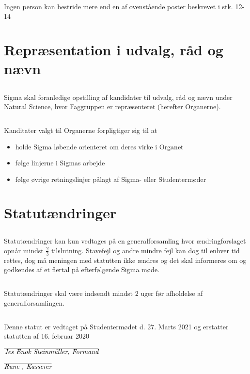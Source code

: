 \documentclass[danish,a4paper,twocolumn]{article}
\begin{document}
\subsection{}Ingen person kan bestride mere end en af ovenstående poster beskrevet i stk. 12-14

\section{Repræsentation i udvalg, råd og nævn}
\subsection{}Sigma skal foranledige opstilling af kandidater til udvalg, råd og
nævn under Natural Science, hvor Faggruppen er repræsenteret (herefter Organerne).

\subsection{}Kanditater valgt til Organerne forpligtiger sig til at
\begin{itemize}
        \item holde Sigma løbende orienteret om deres virke i Organet
        \item følge linjerne i Sigmas arbejde
        \item følge øvrige retningslinjer pålagt af Sigma- eller Studentermøder
\end{itemize}

\section{Statutændringer}\label{par:aendringer}
\subsection{}Statutændringer kan kun vedtages på en generalforsamling hvor ændringforslaget opnår mindst $\frac{2}{3}$ tilslutning. Stavefejl og andre mindre fejl kan dog til enhver tid rettes, dog må meningen med statutten ikke ændres og det skal informeres om og godkendes af et flertal på efterfølgende Sigma møde.

\subsection{}Statutændringer skal være indsendt mindst 2 uger før afholdelse af generalforsamlingen.


\subsection{}Denne statut er vedtaget på Studentermødet d. 27. Marts 2021 og erstatter statutten af 16. februar 2020

\vspace{2cm}
$\overline{\emph{Jes Enok Steinmüller, Formand}}$

\vspace{1cm}
$\overline{\emph{Rune , Kasserer}}$
\end{document}
